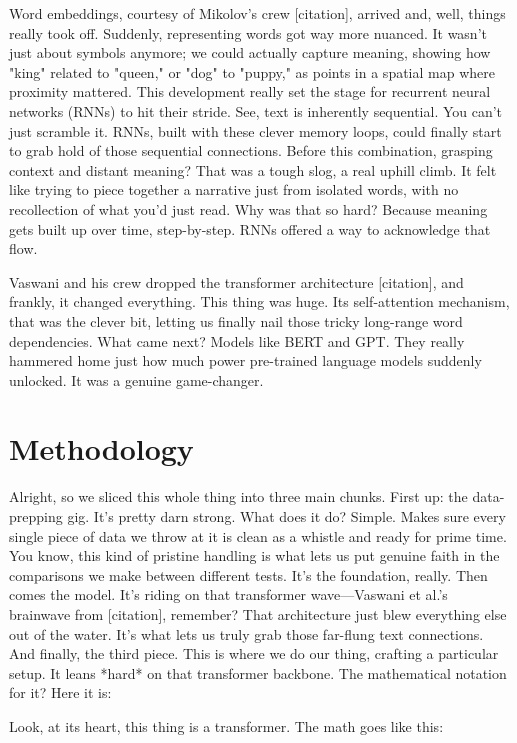\documentclass{article}
\begin{document}
Word embeddings, courtesy of Mikolov's crew [citation], arrived and, well, things really took off. Suddenly, representing words got way more nuanced. It wasn't just about symbols anymore; we could actually capture meaning, showing how "king" related to "queen," or "dog" to "puppy," as points in a spatial map where proximity mattered. This development really set the stage for recurrent neural networks (RNNs) to hit their stride. See, text is inherently sequential. You can't just scramble it. RNNs, built with these clever memory loops, could finally start to grab hold of those sequential connections. Before this combination, grasping context and distant meaning? That was a tough slog, a real uphill climb. It felt like trying to piece together a narrative just from isolated words, with no recollection of what you'd just read. Why was that so hard? Because meaning gets built up over time, step-by-step. RNNs offered a way to acknowledge that flow.

Vaswani and his crew dropped the transformer architecture [citation], and frankly, it changed everything. This thing was huge. Its self-attention mechanism, that was the clever bit, letting us finally nail those tricky long-range word dependencies. What came next? Models like BERT and GPT. They really hammered home just how much power pre-trained language models suddenly unlocked. It was a genuine game-changer.

\section{Methodology}

Alright, so we sliced this whole thing into three main chunks. First up: the data-prepping gig. It's pretty darn strong. What does it do? Simple. Makes sure every single piece of data we throw at it is clean as a whistle and ready for prime time. You know, this kind of pristine handling is what lets us put genuine faith in the comparisons we make between different tests. It's the foundation, really. Then comes the model. It’s riding on that transformer wave—Vaswani et al.’s brainwave from [citation], remember? That architecture just blew everything else out of the water. It’s what lets us truly grab those far-flung text connections. And finally, the third piece. This is where we do our thing, crafting a particular setup. It leans *hard* on that transformer backbone. The mathematical notation for it? Here it is:

Look, at its heart, this thing is a transformer. The math goes like this:
\end{document}
